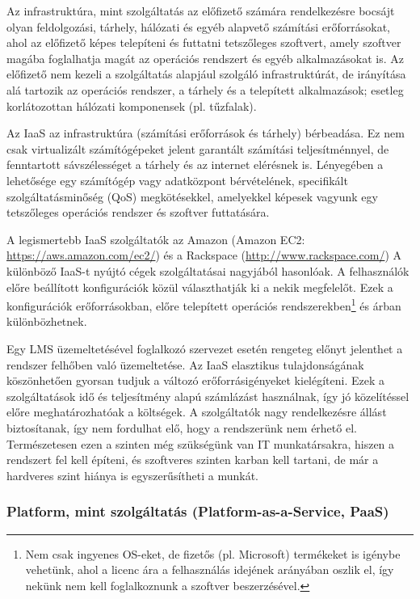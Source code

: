 Az infrastruktúra, mint szolgáltatás az előfizető számára rendelkezésre bocsájt olyan feldolgozási, tárhely, hálózati és egyéb alapvető számítási erőforrásokat, ahol az előfizető képes telepíteni és futtatni tetszőleges szoftvert, amely szoftver magába foglalhatja magát az operációs rendszert és egyéb alkalmazásokat is. Az előfizető nem kezeli a szolgáltatás alapjául szolgáló infrastruktúrát, de irányítása alá tartozik az operációs rendszer, a tárhely és a telepített alkalmazások; esetleg korlátozottan hálózati komponensek (pl. tűzfalak).\cite{nistsp800-145}

Az IaaS az infrastruktúra (számítási erőforrások és tárhely) bérbeadása. Ez nem csak virtualizált számítógépeket jelent garantált számítási teljesítménnyel, de fenntartott sávszélességet a tárhely és az internet elérésnek is. Lényegében a lehetősége egy számítógép vagy adatközpont bérvételének, specifikált szolgáltatásminőség (QoS) megkötésekkel, amelyekkel képesek vagyunk egy tetszőleges operációs rendszer és szoftver futtatására.\cite{ccwlinux}

A legismertebb IaaS szolgáltatók az Amazon (Amazon EC2: \href{https://aws.amazon.com/ec2/}{https://aws.amazon.com/ec2/}) és a Rackspace (\href{http://www.rackspace.com/}{http://www.rackspace.com/}) A különböző IaaS-t nyújtó cégek szolgáltatásai nagyjából hasonlóak. A felhasználók előre beállított konfigurációk közül választhatják ki a nekik megfelelőt. Ezek a konfigurációk erőforrásokban, előre telepített operációs rendszerekben\footnote{Nem csak ingyenes OS-eket, de fizetős (pl. Microsoft) termékeket is igénybe vehetünk, ahol a licenc ára a felhasználás idejének arányában oszlik el, így nekünk nem kell foglalkoznunk a szoftver beszerzésével.} és árban különbözhetnek.

Egy LMS üzemeltetésével foglalkozó szervezet esetén rengeteg előnyt jelenthet a rendszer felhőben való üzemeltetése. Az IaaS elasztikus tulajdonságának köszönhetően gyorsan tudjuk a változó erőforrásigényeket kielégíteni. Ezek a szolgáltatások idő és teljesítmény alapú számlázást használnak, így jó közelítéssel előre meghatározhatóak a költségek. A szolgáltatók nagy rendelkezésre állást biztosítanak, így nem fordulhat elő, hogy a rendszerünk nem érhető el. Természetesen ezen a szinten még szükségünk van IT munkatársakra, hiszen a rendszert fel kell építeni, és szoftveres szinten karban kell tartani, de már a hardveres szint hiánya is egyszerűsítheti a munkát.


\subsubsection{Platform, mint szolgáltatás (\foreignlanguage{english}{Platform-as-a-Service, PaaS})}

